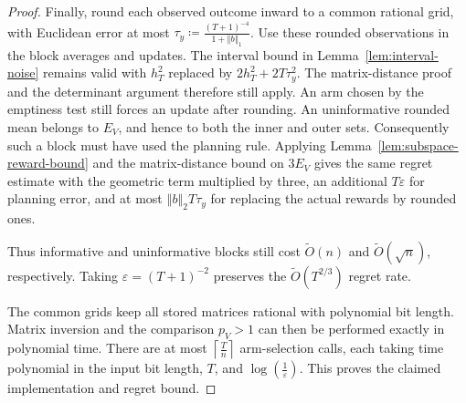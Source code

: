 {{\begin{proof}
Finally, round each observed outcome inward to a common rational grid,
with Euclidean error at most
$\tau_{y} \coloneqq \frac{{\left( T + 1 \right)}^{- 4}}{1 + {\left\Vert b \right\Vert}_{1}}$. Use these rounded observations in
the block averages and updates. The interval bound in
Lemma~\ref{lem:interval-noise} remains valid with $h_{T}^{2}$ replaced by
$2 h_{T}^{2} + 2 T \tau_{y}^{2}$. The matrix-distance proof and the determinant
argument therefore still apply. An arm chosen by the emptiness test
still forces an update after rounding. An uninformative rounded mean belongs
to $E_{V}$, and hence to both the inner and outer sets. Consequently
such a block must have used the planning rule. Applying
Lemma~\ref{lem:subspace-reward-bound} and the matrix-distance bound on $3 E_{V}$
gives the same regret estimate with the geometric term multiplied
by three, an additional $T \varepsilon$ for planning error, and at most
${\left\Vert b \right\Vert}_{2} T \tau_{y}$ for replacing the actual rewards by rounded ones.

Thus informative and uninformative blocks still cost
$\tilde{O}(n)$ and $\tilde{O}(\sqrt{n})$, respectively. Taking
$\varepsilon=(T+1)^{-2}$ preserves the
$\tilde{O}(T^{2/3})$ regret rate.

The common grids keep all stored matrices rational with polynomial
bit length. Matrix inversion and the comparison $p_{V} > 1$ can then be
performed exactly in polynomial time. There are at most
$\left\lceil \frac{T}{n} \right\rceil$ arm-selection calls, each taking time polynomial in the input
bit length, $T$, and $\operatorname{log} \left( \frac{1}{\varepsilon} \right)$. This proves the claimed
implementation and regret bound.
\end{proof}
}


\clearpage
{}}

